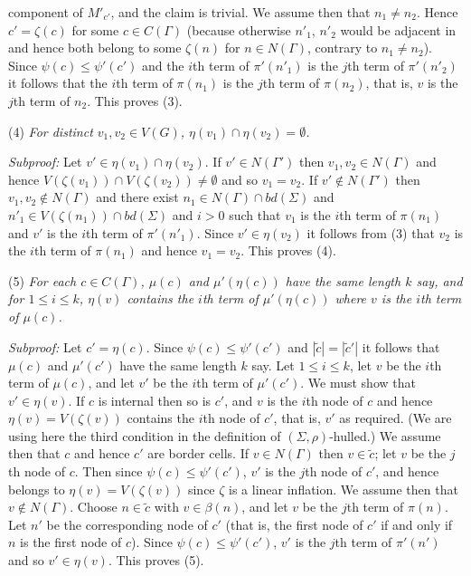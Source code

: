 \noindent component of $M'_{c'}$, and the claim is trivial. We assume then that $n_1 \ne n_2$. Hence $c' = \zeta(c)$ for some $c \in C(\Gamma)$ (because otherwise $n'_1$, $n'_2$ would be adjacent in and hence both belong to some $\zeta(n)$ for $n \in N(\Gamma)$, contrary to $n_1 \ne n_2$). Since $\psi(c) \le \psi'(c')$ and the $i$th term of $\pi'(n'_1)$ is the $j$th term of $\pi'(n'_2)$ it follows that the $i$th term of $\pi(n_1)$ is the $j$th term of $\pi(n_2)$, that is, $v$ is the $j$th term of $n_2$. This proves (3).

\hspace*{12pt}(4) \textit{For distinct $v_1, v_2 \in V(G)$, $\eta(v_1) \cap \eta(v_2) = \emptyset$.}

\textit{Subproof:} Let $v' \in \eta(v_1) \cap \eta(v_2)$. If $v' \in N(\Gamma')$ then $v_1, v_2 \in N(\Gamma)$ and hence $V(\zeta(v_1)) \cap V(\zeta(v_2)) \ne \emptyset$ and so $v_1 = v_2$. If $v' \notin N(\Gamma')$ then $v_1, v_2 \notin N(\Gamma)$ and there exist $n_1 \in N(\Gamma) \cap bd(\Sigma)$ and $n'_1 \in V(\zeta(n_1)) \cap bd(\Sigma)$ and $i > 0$ such that $v_1$ is the $i$th term of $\pi(n_1)$ and $v'$ is the $i$th term of $\pi'(n'_1)$. Since $v' \in \eta(v_2)$ it follows from (3) that $v_2$ is the $i$th term of $\pi(n_1)$ and hence $v_1 = v_2$. This proves (4).

\hspace*{12pt}(5) \textit{For each $c \in C(\Gamma)$, $\mu(c)$ and $\mu'(\eta(c))$ have the same length $k$ say, and for $1 \le i \le k$, $\eta(v)$ contains the $i$th term of $\mu'(\eta(c))$ where $v$ is the $i$th term of $\mu(c)$.}

\textit{Subproof:} Let $c' = \eta(c)$. Since $\psi(c) \le \psi'(c')$ and $|\tilde{c}| = |\tilde{c}'|$ it follows that $\mu(c)$ and $\mu'(c')$ have the same length $k$ say. Let $1 \le i \le k$, let $v$ be the $i$th term of $\mu(c)$, and let $v'$ be the $i$th term of $\mu'(c')$. We must show that $v' \in \eta(v)$. If $c$ is internal then so is $c'$, and $v$ is the $i$th node of $c$ and hence $\eta(v) = V(\zeta(v))$ contains the $i$th node of $c'$, that is, $v'$ as required. (We are using here the third condition in the definition of $(\Sigma, \rho)$-hulled.) We assume then that $c$ and hence $c'$ are border cells. If $v \in N(\Gamma)$ then $v \in \tilde{c}$; let $v$ be the $j$th node of $c$. Then since $\psi(c) \le \psi'(c')$, $v'$ is the $j$th node of $c'$, and hence belongs to $\eta(v) = V(\zeta(v))$ since $\zeta$ is a linear inflation. We assume then that $v \notin N(\Gamma)$. Choose $n \in \tilde{c}$ with $v \in \beta(n)$, and let $v$ be the $j$th term of $\pi(n)$. Let $n'$ be the corresponding node of $c'$ (that is, the first node of $c'$ if and only if $n$ is the first node of $c$). Since $\psi(c) \le \psi'(c')$, $v'$ is the $j$th term of $\pi'(n')$ and so $v' \in \eta(v)$. This proves (5).

